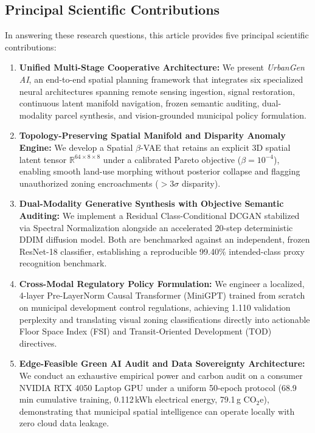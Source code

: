 \documentclass[journal]{IEEEtran}
\begin{document}
\subsection{Principal Scientific Contributions}
In answering these research questions, this article provides five principal scientific contributions:
\begin{enumerate}
    \item \textbf{Unified Multi-Stage Cooperative Architecture:} We present \textit{UrbanGen AI}, an end-to-end spatial planning framework that integrates six specialized neural architectures spanning remote sensing ingestion, signal restoration, continuous latent manifold navigation, frozen semantic auditing, dual-modality parcel synthesis, and vision-grounded municipal policy formulation.
    \item \textbf{Topology-Preserving Spatial Manifold and Disparity Anomaly Engine:} We develop a Spatial $\beta$-VAE that retains an explicit 3D spatial latent tensor $\mathbb{R}^{64 \times 8 \times 8}$ under a calibrated Pareto objective ($\beta = 10^{-4}$), enabling smooth land-use morphing without posterior collapse and flagging unauthorized zoning encroachments ($>3\sigma$ disparity).
    \item \textbf{Dual-Modality Generative Synthesis with Objective Semantic Auditing:} We implement a Residual Class-Conditional DCGAN stabilized via Spectral Normalization alongside an accelerated 20-step deterministic DDIM diffusion model. Both are benchmarked against an independent, frozen ResNet-18 classifier, establishing a reproducible 99.40\% intended-class proxy recognition benchmark.
    \item \textbf{Cross-Modal Regulatory Policy Formulation:} We engineer a localized, 4-layer Pre-LayerNorm Causal Transformer (MiniGPT) trained from scratch on municipal development control regulations, achieving 1.110 validation perplexity and translating visual zoning classifications directly into actionable Floor Space Index (FSI) and Transit-Oriented Development (TOD) directives.
    \item \textbf{Edge-Feasible Green AI Audit and Data Sovereignty Architecture:} We conduct an exhaustive empirical power and carbon audit on a consumer NVIDIA RTX 4050 Laptop GPU under a uniform 50-epoch protocol (68.9\,min cumulative training, 0.112\,kWh electrical energy, 79.1\,g CO$_2$e), demonstrating that municipal spatial intelligence can operate locally with zero cloud data leakage.
\end{enumerate}
\end{document}
